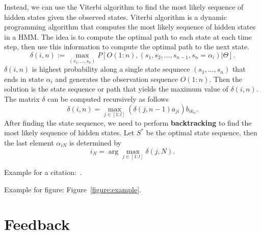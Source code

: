 \documentclass[a4paper, 9pt, twocolumn]{extarticle}
\begin{document}
Instead, we can use the Viterbi algorithm to find the most likely sequence of hidden states given the observed states. Viterbi algorithm is a dynamic programming algorithm that computes the most likely sequence of hidden states in a HMM. 
The idea is to compute the optimal path to each state at each time step, then use this information to compute the optimal path to the next state.
\begin{equation}
    \delta(i, n) := \max_{(s_1, \ldots ,s_{n})} P[O(1:n), (s_1, s_2, \ldots, s_{n-1}, s_n = \alpha_i)| \Theta].
\end{equation}
$\delta(i,n)$ is highest probability along a single state sequnece $(s_1, \ldots, s_n)$ that ends in state $\alpha_i$ and generates the observation sequence $O(1:n)$. Then the solution is the state sequence or path that yields the maximum value of $\delta(i,n)$. The matrix $\delta$ can be computed recursively as follows
\begin{equation}
    \delta(i, n) = \max_{j \in [1:l]} (\delta(j, n-1) a_{ji} )b_{ik_n}.
\end{equation}
After finding the state sequence, we need to perform \textbf{backtracking} to find the most likely sequence of hidden states. Let $S^*$ be the optimal state sequence, then  the last element $\alpha_{iN}$ is determined by 
\begin{equation}
    i_N = \arg \max_{j \in [1:l]} \delta(j, N).
\end{equation}



Example for a citation:~\cite{Mueller21_FMP_SPRINGER}.

Example for figure: Figure~\ref{figure:example}.

\newpage

\section{Feedback}
\label{section:feedback}
\end{document}
